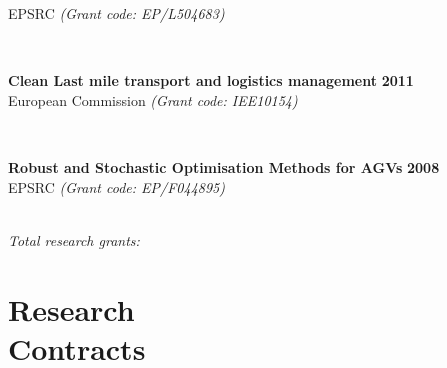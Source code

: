 \documentclass[margin]{res}
\newcommand\tab[1][1cm]{\hspace*{#1}}
\begin{document}
\begin{resume}
\begin{minipage}{\textwidth}
	\tab[0.2in] 
	\quad EPSRC
	\textit{(Grant code: EP/L504683)}
	\end{minipage}
	\\
	\vspace{0.03in}
	\begin{minipage}{\textwidth}
	{\bf Clean Last mile transport and logistics management} \hfill {\bf 2011} \\
	\tab[0.2in] 
	\quad European Commission
	\textit{(Grant code: IEE10154)}
	\end{minipage}
	\\
	\vspace{0.03in}
	\begin{minipage}{\textwidth}
	{\bf Robust and Stochastic Optimisation Methods for AGVs} \hfill {\bf 2008} \\
	\tab[0.2in] 
	\quad EPSRC
	\textit{(Grant code: EP/F044895)}
	\end{minipage}
	\\

\vspace{-0.25in}
\textit{Total research grants: }

\section{\sc Research\\ Contracts}


\end{resume}
\end{document}
